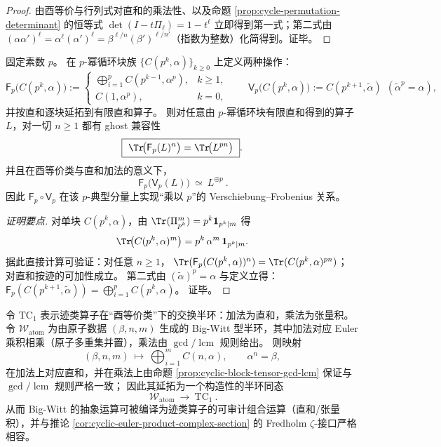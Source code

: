 \begin{proof}
由酉等价与行列式对直和的乘法性、以及命题 \ref{prop:cycle-permutation-determinant} 的恒等式
\(
\det(I-t\Pi_{\ell})=1-t^{\ell}
\)
立即得到第一式；第二式由 \((\alpha\alpha')^{\ell}=\alpha^{\ell}(\alpha')^{\ell}=\beta^{\ell/n}(\beta')^{\ell/n'}\)（指数为整数）化简得到。证毕。
\end{proof}

\begin{proposition}\label{prop:cyclic-p-typical-frobenius-verschiebung}
固定素数 \(p\)。
在 \(p\)-幂循环块族 \(\{C(p^k,\alpha)\}_{k\ge 0}\) 上定义两种操作：
\[
\mathsf F_p\bigl(C(p^k,\alpha)\bigr):=
\begin{cases}
\bigoplus_{i=1}^{p} C(p^{k-1},\alpha^{p}),& k\ge 1,\\
C(1,\alpha^{p}),& k=0,
\end{cases}
\qquad
\mathsf V_p\bigl(C(p^k,\alpha)\bigr):=C(p^{k+1},\widetilde\alpha)\ \ (\widetilde\alpha^{p}=\alpha),
\]
并按直和逐块延拓到有限直和算子。
则对任意由 \(p\)-幂循环块有限直和得到的算子 \(L\)，对一切 \(n\ge 1\) 都有 ghost 兼容性
\[
\boxed{\ \Tr\!\bigl(\mathsf F_p(L)^n\bigr)=\Tr\!\bigl(L^{pn}\bigr)\ }.
\]
并且在酉等价类与直和加法的意义下，
\[
\boxed{\ \mathsf F_p\!\bigl(\mathsf V_p(L)\bigr)\ \simeq\ L^{\oplus p}\ }.
\]
因此 \(\mathsf F_p\circ \mathsf V_p\) 在该 \(p\)-典型分量上实现“乘以 \(p\)”的 Verschiebung--Frobenius 关系。
\end{proposition}

\begin{proof}[证明要点]
对单块 \(C(p^k,\alpha)\)，由 \(\Tr(\Pi_{p^k}^m)=p^k\mathbf{1}_{p^k\mid m}\) 得
\[
\Tr\!\bigl(C(p^k,\alpha)^{m}\bigr)=p^k\,\alpha^{m}\,\mathbf{1}_{p^k\mid m}.
\]
据此直接计算可验证：对任意 \(n\ge 1\)，
\(\Tr(\mathsf F_p(C(p^k,\alpha))^n)=\Tr(C(p^k,\alpha)^{pn})\)；
对直和按迹的可加性成立。
第二式由 \((\widetilde\alpha)^p=\alpha\) 与定义立得：
\(\mathsf F_p(C(p^{k+1},\widetilde\alpha))=\bigoplus_{i=1}^{p}C(p^k,\alpha)\)。
证毕。
\end{proof}

\begin{theorem}\label{thm:atomic-witt-into-tc1}
令 \(\mathrm{TC}_1\) 表示迹类算子在“酉等价类”下的交换半环：加法为直和，乘法为张量积。
令 \(\mathcal{W}_{\mathrm{atom}}\) 为由原子数据 \((\beta,n,m)\) 生成的 Big-Witt 型半环，其中加法对应 Euler 乘积相乘（原子多重集并置），乘法由 \(\gcd/\operatorname{lcm}\) 规则给出。
则映射
\[
(\beta,n,m)\ \longmapsto\ \bigoplus_{i=1}^{m} C\!\left(n,\alpha\right),
\qquad \alpha^{n}=\beta,
\]
在加法上对应直和，并在乘法上由命题 \ref{prop:cyclic-block-tensor-gcd-lcm} 保证与 \(\gcd/\operatorname{lcm}\) 规则严格一致；
因此其延拓为一个构造性的半环同态
\[
\boxed{\ \mathcal{W}_{\mathrm{atom}}\ \longrightarrow\ \mathrm{TC}_1\ }.
\]
从而 Big-Witt 的抽象运算可被编译为迹类算子的可审计组合运算（直和/张量积），并与推论 \ref{cor:cyclic-euler-product-complex-section} 的 Fredholm \(\zeta\)-接口严格相容。
\end{theorem}

